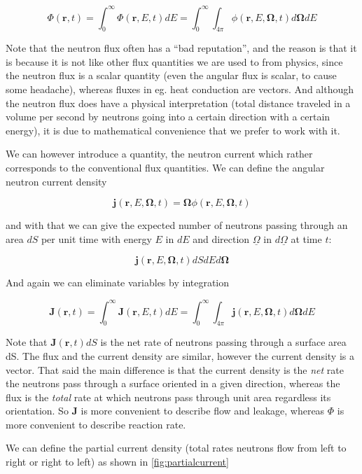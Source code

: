 $$\Phi(\mathbf{r},t)=\int^\infty_0\Phi(\mathbf{r},E,t)dE=\int^\infty_0\int_{4\pi}\phi(\mathbf{r},E,\mathbf{\Omega},t)d\mathbf{\Omega}dE$$

Note that the neutron flux often has a ``bad reputation'', and the reason is that it is because it is not like other flux quantities we are used to from physics, since the neutron flux is a scalar quantity (even the angular flux is scalar, to cause some headache), whereas fluxes in eg. heat conduction are vectors. And although the neutron flux does have a physical interpretation (total distance traveled in a volume per second by neutrons going into a certain direction with a certain energy), it is due to mathematical convenience that we prefer to work with it. 

We can however introduce a quantity, the neutron current which rather corresponds to the conventional flux quantities. We can define the angular neutron current density

\begin{equation}
\mathbf{j}(\mathbf{r},E,\mathbf{\Omega},t)=\mathbf{\Omega}\phi(\mathbf{r},E,\mathbf{\Omega},t)
\end{equation}

\noindent and with that we can give the expected number of neutrons passing through an area $dS$ per unit time with energy $E$ in $dE$ and direction $\underline\Omega$ in $d\underline\Omega$ at time $t$:

$$\mathbf{j}(\mathbf{r},E,\mathbf{\Omega},t)dSdEd\mathbf{\Omega}$$

And again we can eliminate variables by integration

$$\mathbf{J}(\mathbf{r},t)=\int^\infty_0\mathbf{J}(\mathbf{r},E,t)dE=\int^\infty_0\int_{4\pi}\mathbf{j}(\mathbf{r},E,\mathbf{\Omega},t)d\mathbf{\Omega}dE$$

Note that $\mathbf{J}(\mathbf{r},t)dS$ is the net rate of neutrons passing through a surface area dS. The flux and the current density are similar, however the current density is a vector. That said the main difference is that the current density is the \textit{net} rate the neutrons pass through a surface oriented in a given direction, whereas the flux is the \textit{total} rate at which neutrons pass through unit area regardless its orientation. So $\mathbf{J}$ is more convenient to describe flow and leakage, whereas $\Phi$ is more convenient to describe reaction rate.

We can define the partial current density (total rates neutrons flow from left to right or right to left) as shown in \autoref{fig:partialcurrent}

